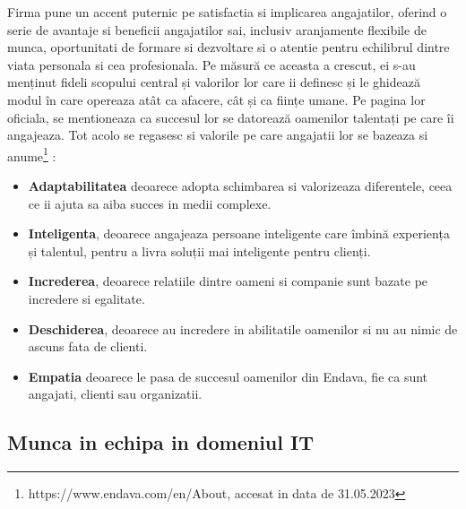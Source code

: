 \documentclass[a4paper, 12pt]{article}
\begin{document}
	\quad \quad Firma pune un accent puternic pe satisfactia si implicarea angajatilor, oferind o serie de avantaje si beneficii angajatilor sai, inclusiv aranjamente flexibile de munca, oportunitati de formare si dezvoltare si o atentie pentru echilibrul dintre viata personala si cea profesionala. Pe măsură ce aceasta a crescut, ei s-au menținut fideli scopului central și valorilor lor care ii definesc și le ghidează modul în care opereaza  atât ca afacere, cât și ca ființe umane. Pe pagina lor oficiala, se mentioneaza ca succesul lor se datorează oamenilor talentați pe care îi angajeaza. Tot acolo se regasesc si valorile pe care angajatii lor se bazeaza si anume\footnote{https://www.endava.com/en/About, accesat in data de 31.05.2023} :
	\begin{itemize}

	\item  \textbf{Adaptabilitatea} deoarece adopta schimbarea si valorizeaza diferentele, ceea ce ii ajuta sa aiba succes in medii complexe.
	\item \textbf{Inteligenta}, deoarece angajeaza persoane inteligente care îmbină experiența și talentul, pentru a livra soluții mai inteligente pentru clienți.
	\item \textbf{Increderea}, deoarece relatiile dintre oameni si companie sunt bazate pe incredere si egalitate.
	\item \textbf{Deschiderea}, deoarece au incredere in abilitatile oamenilor si nu au nimic de ascuns fata de clienti.
	\item \textbf{Empatia} deoarece le pasa de succesul oamenilor din Endava, fie ca sunt angajati, clienti sau organizatii.

	\end{itemize}

	\subsection{Munca in echipa in domeniul IT}
\end{document}
